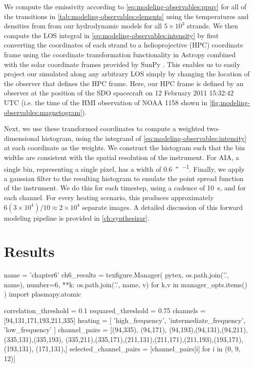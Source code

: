 We compute the emissivity according to \autoref{eq:modeling-observables:ppuv} for all of the transitions in \autoref{tab:modeling-observables:elements} using the temperatures and densities from from our hydrodynamic models for all $5\times10^3$ strands. We then compute the LOS integral in \autoref{eq:modeling-observables:intensity} by first converting the coordinates of each strand to a helioprojective (HPC) coordinate frame \citep[see][]{thompson_coordinate_2006} using the coordinate transformation functionality in Astropy \citep{the_astropy_collaboration_astropy_2018} combined with the solar coordinate frames provided by SunPy \citep{sunpy_community_sunpypython_2015}. This enables us to easily project our simulated \AR{} along any arbitrary LOS simply by changing the location of the observer that defines the HPC frame. Here, our HPC frame is defined by an observer at the position of the SDO spacecraft on 12 February 2011 15:32:42 UTC (i.e. the time of the HMI observation of NOAA 1158 shown in \autoref{fig:modeling-observables:magnetogram}).

Next, we use these transformed coordinates to compute a weighted two-dimensional histogram, using the integrand of \autoref{eq:modeling-observables:intensity} at each coordinate as the weights. We construct the histogram such that the bin widths are consistent with the spatial resolution of the instrument. For AIA, a single bin, representing a single pixel, has a width of \SI{0.6}{\arcsecond\per\pixel}. Finally, we  apply a gaussian filter to the resulting histogram to emulate the point spread function of the instrument. We do this for each timestep, using a cadence of \SI{10}{\second}, and for each channel. For every heating scenario, this produces approximately $6(3\times10^4)/10\approx2\times10^4$ separate images. A detailed discussion of this forward modeling pipeline is provided in \autoref{ch:synthesizar}.


\section{Results}\label{sec:modeling-observables:results}

\begin{pycode}
name = 'chapter6'
ch6_results = texfigure.Manager(
    pytex,
    os.path.join('.', name),
    number=6,
    **{k: os.path.join('.', name, v) for k,v in manager_opts.items()}
)
import plasmapy.atomic

correlation_threshold = 0.1
rsquared_threshold = 0.75
channels = [94,131,171,193,211,335]
heating = [ 'high_frequency', 'intermediate_frequency', 'low_frequency' ]
channel_pairs = [(94,335), (94,171), (94,193),(94,131),(94,211),(335,131),(335,193),
				 (335,211),(335,171),(211,131),(211,171),(211,193),(193,171),(193,131),
				 (171,131),]
selected_channel_pairs = [channel_pairs[i] for i in (0, 9, 12)]
\end{pycode}

